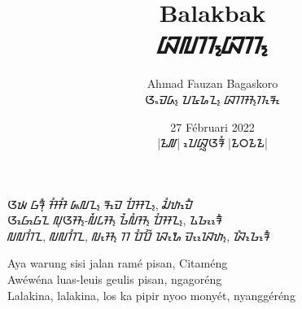 \documentclass{memoir}
\begin{document}
\title{Balakbak\\ᮘᮜᮊ᮪ᮘᮊ᮪}
\author{Ahmad Fauzan Bagaskoro\\ᮃᮂᮙᮓ᮪ ᮖᮅᮐᮔ᮪ ᮘᮊᮞ᮪ᮊᮧᮛᮧ}
\date{27 Fébruari 2022\\|᮲᮷| ᮖᮦᮘᮢᮥᮃᮛᮤ |᮲᮰᮲᮲|}
\maketitle
\noindent
ᮃᮚ ᮝᮛᮥᮀ ᮞᮤᮞᮤ ᮏᮜᮔ᮪ ᮛᮙᮦ ᮕᮤᮞᮔ᮪, ᮎᮤᮒᮙᮦᮀ\\
ᮃᮝᮦᮝᮦᮔ ᮜᮥᮃᮞ᮪-ᮜᮩᮄᮞ᮪ ᮌᮩᮜᮤᮞ᮪ ᮕᮤᮞᮔ᮪, ᮍᮌᮧᮛᮦᮀ\\
ᮜᮜᮊᮤᮔ, ᮜᮜᮊᮤᮔ, ᮜᮧᮞ᮪ ᮊ ᮕᮤᮕᮤᮁ ᮑᮧᮇ ᮙᮧᮑᮦᮒ᮪, ᮑᮀᮌᮦᮛᮦᮀ

\bigskip

\noindent
Aya warung sisi jalan ramé pisan, Citaméng\\
Awéwéna luas-leuis geulis pisan, ngagoréng\\
Lalakina, lalakina, los ka pipir nyoo monyét, nyanggéréng
\end{document}
